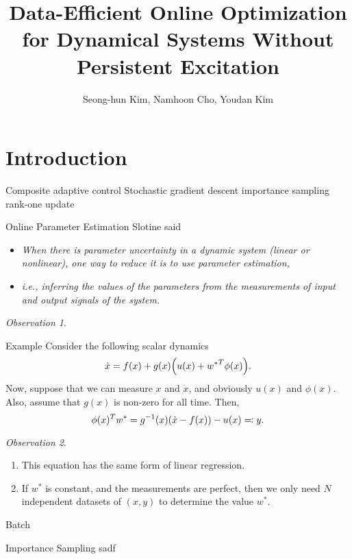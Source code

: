 \documentclass{beamer}
\title{Data-Efficient Online Optimization for Dynamical Systems Without
Persistent Excitation}
\author{Seong-hun Kim, Namhoon Cho, Youdan Kim}
\theoremstyle{definition}
\theoremstyle{remark}
\newtheorem{observation}{Observation}
\begin{document}
\begin{frame}
	\maketitle
\end{frame}


\section{Introduction}

\begin{frame}
	Composite adaptive control
	Stochastic gradient descent
	importance sampling
	rank-one update
\end{frame}

\begin{frame}{Online Parameter Estimation}
	Slotine said~
	\begin{itemize}
		\item {\it When there is parameter uncertainty in a dynamic system (linear or
			nonlinear), one way to reduce it is to use parameter estimation,}
		\item {\it i.e., inferring the values of the parameters from the
			measurements of input and output signals of the system.}
	\end{itemize}
	\begin{observation}
	\end{observation}
\end{frame}

\begin{frame}{Example}
	Consider the following scalar dynamics
	\begin{equation*}
		\dot{x} = f(x) + g(x) \qty(u(x) + {w^\ast}^T \phi(x)).
	\end{equation*}
	\pause
	Now, suppose that we can measure $x$ and $\dot{x}$, and obviously $u(x)$ and
	$\phi(x)$. Also, assume that $g(x)$ is non-zero for all time. Then,
	\begin{equation*}
		\phi(x)^T w^\ast = g^{-1}(x) \qty(\dot{x} - f(x)) - u(x) \eqqcolon y.
	\end{equation*}
	\begin{observation}
		\begin{enumerate}
			\item This equation has the same form of linear regression.
			\item If $w^\ast$ is constant, and the measurements are perfect, then we
				only need $N$ independent datasets of $(x, y)$ to determine the value
				$w^\ast$.
		\end{enumerate}
	\end{observation}
\end{frame}

\begin{frame}
	Batch

\end{frame}

\begin{frame}{Importance Sampling}
	sadf
\end{frame}
\end{document}
